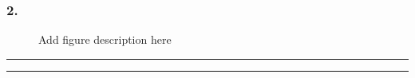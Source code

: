 \documentclass{article}
\begin{document}
\subsubsection*{2.}

\begin{figure}[h!]
\centering

\caption{Add figure description here}
\label{fig3}
\end{figure}


\hrule
\hrule



\end{document}
